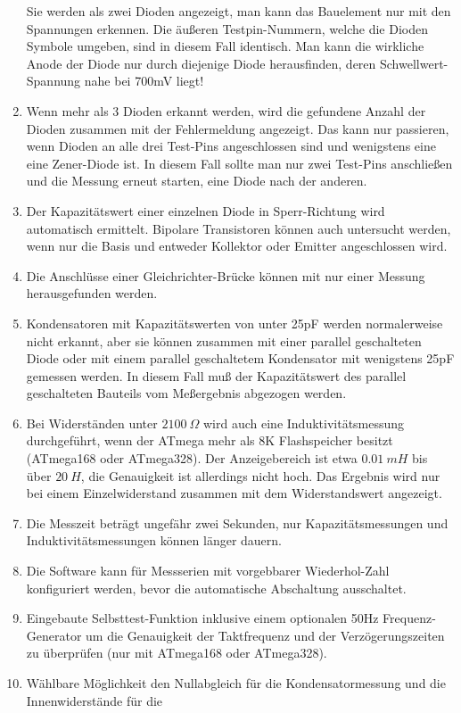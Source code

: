 \begin{enumerate}
Sie werden als zwei Dioden angezeigt, man kann das Bauelement nur mit den Spannungen erkennen.
Die äußeren Testpin-Nummern, welche die Dioden Symbole umgeben, sind in diesem Fall identisch.
Man kann die wirkliche Anode der Diode nur durch diejenige Diode herausfinden, deren Schwellwert-Spannung nahe bei 700mV liegt!
\item Wenn mehr als 3 Dioden erkannt werden, wird die gefundene Anzahl der Dioden zusammen mit der Fehlermeldung angezeigt.
Das kann nur passieren, wenn Dioden an alle drei Test-Pins angeschlossen sind und wenigstens eine eine Zener-Diode ist.
In diesem Fall sollte man nur zwei Test-Pins anschließen und die Messung erneut starten, eine Diode nach der anderen.
\item Der Kapazitätswert einer einzelnen Diode in Sperr-Richtung wird automatisch ermittelt.
Bipolare Transistoren können auch untersucht werden, wenn nur die Basis und entweder Kollektor oder Emitter angeschlossen wird.
\item Die Anschlüsse einer Gleichrichter-Brücke können mit nur einer Messung herausgefunden werden.
\item Kondensatoren mit Kapazitätswerten von unter 25pF werden normalerweise nicht erkannt, 
aber sie können zusammen mit einer parallel geschalteten Diode oder mit einem parallel geschaltetem Kondensator mit
wenigstens 25pF gemessen werden.
In diesem Fall muß der Kapazitätswert des parallel geschalteten Bauteils vom Meßergebnis abgezogen werden.
\item Bei Widerständen unter \(2100~\Omega\) wird auch eine Induktivitätsmessung durchgeführt, wenn der
ATmega mehr als 8K Flashspeicher besitzt (ATmega168 oder ATmega328).
Der Anzeigebereich ist etwa \(0.01~mH\) bis über \(20~H\), die Genauigkeit ist allerdings nicht hoch.
Das Ergebnis wird nur bei einem Einzelwiderstand zusammen mit dem Widerstandswert angezeigt.
\item Die Messzeit beträgt ungefähr zwei Sekunden, nur Kapazitätsmessungen und Induktivitätsmessungen können länger dauern.
\item Die Software kann für Messserien mit vorgebbarer Wiederhol-Zahl konfiguriert werden, bevor die automatische Abschaltung ausschaltet.
\item Eingebaute Selbsttest-Funktion inklusive einem optionalen 50Hz Frequenz-Generator um die Genauigkeit der Taktfrequenz
und der Verzögerungszeiten zu überprüfen (nur mit ATmega168 oder ATmega328).
\item Wählbare Möglichkeit den Nullabgleich für die Kondensatormessung und die Innenwiderstände für die

\end{enumerate}
